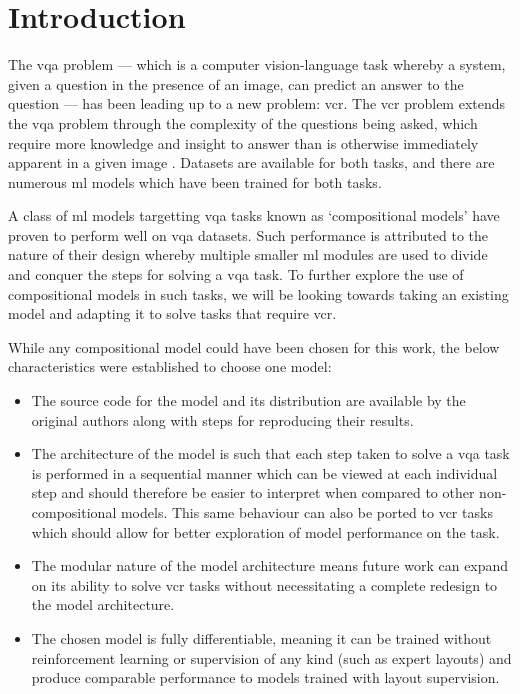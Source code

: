 \chapter{Introduction}
\label{chp:introduction}

The \acrlong{vqa} problem --- which is a computer vision-language task whereby a system, given a question in the presence of an image, can predict an answer to the question \cite{agrawal_vqa_2016} --- has been leading up to a new problem: \acrfull{vcr}.
The \acrshort{vcr} problem extends the \acrshort{vqa} problem through the complexity of the questions being asked, which require more knowledge and insight to answer than is otherwise immediately apparent in a given image \cite{zellers_recognition_2019}.
Datasets are available for both tasks, and there are numerous \gls{ml} models which have been trained for both tasks.

A class of \gls{ml} models targetting \gls{vqa} tasks known as `compositional models'\cite{andreas_neural_2016} have proven to perform well on \gls{vqa} datasets\cite{fishandi_neural_2023}.
Such performance is attributed to the nature of their design whereby multiple smaller \gls{ml} modules are used to divide and conquer the steps for solving a \gls{vqa} task.
To further explore the use of compositional models in such tasks, we will be looking towards taking an existing model and adapting it to solve tasks that require \gls{vcr}.

While any compositional model could have been chosen for this work, the below characteristics were established to choose one model:

\begin{itemize}\label{list:reasons_for_nmn}
    \item The source code for the model and its distribution are available by the original authors along with steps for reproducing their results.
    \item The architecture of the model is such that each step taken to solve a \gls{vqa} task is performed in a sequential manner which can be viewed at each individual step and should therefore be easier to interpret when compared to other non-compositional models.
          This same behaviour can also be ported to \gls{vcr} tasks which should allow for better exploration of model performance on the task.
    \item The modular nature of the model architecture means future work can expand on its ability to solve \gls{vcr} tasks without necessitating a complete redesign to the model architecture.
    \item The chosen model is fully differentiable, meaning it can be trained without reinforcement learning or supervision of any kind (such as expert layouts) and produce comparable performance to models trained with layout supervision.
\end{itemize}

